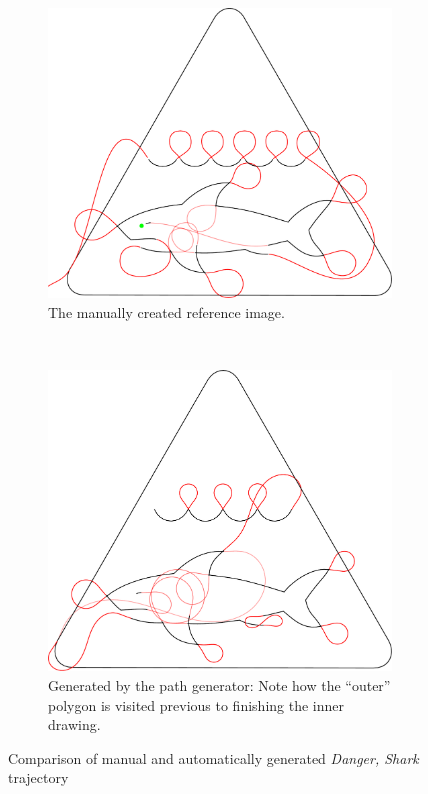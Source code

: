\begin{figure}[h]
\centering
\begin{subfigure}[t]{0.45\textwidth}
	\includegraphics[width=\textwidth]{images/results/shark/hai_achtung.pdf}
	\caption{The manually created reference image.}
\end{subfigure}~
\begin{subfigure}[t]{0.45\textwidth}
	\includegraphics[width=\textwidth]{images/results/shark/export_hai_new.pdf}
	\caption{Generated by the path generator: Note how the \enquote{outer} polygon is visited previous to finishing the inner drawing.}
\end{subfigure}

\caption{Comparison of manual and automatically generated \textit{Danger, Shark} trajectory}
\end{figure}

